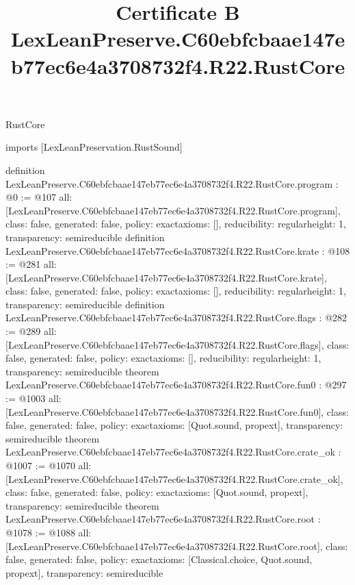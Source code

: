 \begin{lexlean}{RustCore}
\title{Certificate B LexLeanPreserve.C60ebfcbaae147eb77ec6e4a3708732f4.R22.RustCore}
\begin{coremodule}
imports [LexLeanPreservation.RustSound]

definition LexLeanPreserve.C60ebfcbaae147eb77ec6e4a3708732f4.R22.RustCore.program : @0 := @107 {
  all: [LexLeanPreserve.C60ebfcbaae147eb77ec6e4a3708732f4.R22.RustCore.program],
  class: false,
  generated: false,
  policy: exact{axioms: []},
  reducibility: regular{height: 1},
  transparency: semireducible
}
definition LexLeanPreserve.C60ebfcbaae147eb77ec6e4a3708732f4.R22.RustCore.krate : @108 := @281 {
  all: [LexLeanPreserve.C60ebfcbaae147eb77ec6e4a3708732f4.R22.RustCore.krate],
  class: false,
  generated: false,
  policy: exact{axioms: []},
  reducibility: regular{height: 1},
  transparency: semireducible
}
definition LexLeanPreserve.C60ebfcbaae147eb77ec6e4a3708732f4.R22.RustCore.flags : @282 := @289 {
  all: [LexLeanPreserve.C60ebfcbaae147eb77ec6e4a3708732f4.R22.RustCore.flags],
  class: false,
  generated: false,
  policy: exact{axioms: []},
  reducibility: regular{height: 1},
  transparency: semireducible
}
theorem LexLeanPreserve.C60ebfcbaae147eb77ec6e4a3708732f4.R22.RustCore.fun0 : @297 := @1003 {
  all: [LexLeanPreserve.C60ebfcbaae147eb77ec6e4a3708732f4.R22.RustCore.fun0],
  class: false,
  generated: false,
  policy: exact{axioms: [Quot.sound, propext]},
  transparency: semireducible
}
theorem LexLeanPreserve.C60ebfcbaae147eb77ec6e4a3708732f4.R22.RustCore.crate_ok : @1007 := @1070 {
  all: [LexLeanPreserve.C60ebfcbaae147eb77ec6e4a3708732f4.R22.RustCore.crate_ok],
  class: false,
  generated: false,
  policy: exact{axioms: [Quot.sound, propext]},
  transparency: semireducible
}
theorem LexLeanPreserve.C60ebfcbaae147eb77ec6e4a3708732f4.R22.RustCore.root : @1078 := @1088 {
  all: [LexLeanPreserve.C60ebfcbaae147eb77ec6e4a3708732f4.R22.RustCore.root],
  class: false,
  generated: false,
  policy: exact{axioms: [Classical.choice, Quot.sound, propext]},
  transparency: semireducible
}


\end{coremodule}
\end{lexlean}
